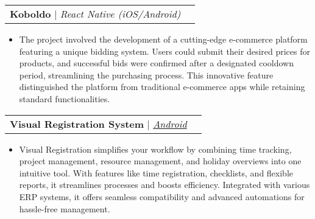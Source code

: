 \documentclass[letterpaper,11pt]{article}
\makeatletter
\newcommand{\resumeItem}[1]{
  \item\small{
    {#1 \vspace{-2pt}}
  }
}
\newcommand{\resumeProjectHeading}[2]{
    \vspace{-2pt}\item
    \begin{tabular*}{0.97\textwidth}{l@{\extracolsep{\fill}}r}
      \small#1 & #2 \\
    \end{tabular*}\vspace{-7pt}
}
\newcommand{\resumeItemListStart}{\begin{itemize}}
\newcommand{\resumeItemListEnd}{\end{itemize}\vspace{-5pt}}
\makeatother
\begin{document}

    \resumeProjectHeading
        {\textbf{Koboldo} $|$ \emph{{React Native (iOS/Android)}}}{}
          \resumeItemListStart
            \resumeItem{The project involved the development of a cutting-edge e-commerce platform featuring a unique bidding system. Users could submit their desired prices for products, and successful bids were confirmed after a designated cooldown period, streamlining the purchasing process. This innovative feature distinguished the platform from traditional e-commerce apps while retaining standard functionalities.}
          \resumeItemListEnd
          
          

    \resumeProjectHeading
        {\textbf{Visual Registration System} $|$ \emph{\href{https://play.google.com/store/apps/details?id=com.visualregistration.v2}{\color{blue}Android}}}{}
          \resumeItemListStart
            \resumeItem{Visual Registration simplifies your workflow by combining time tracking, project management, resource management, and holiday overviews into one intuitive tool. With features like time registration, checklists, and flexible reports, it streamlines processes and boosts efficiency. Integrated with various ERP systems, it offers seamless compatibility and advanced automations for hassle-free management.}
          \resumeItemListEnd
\end{document}
